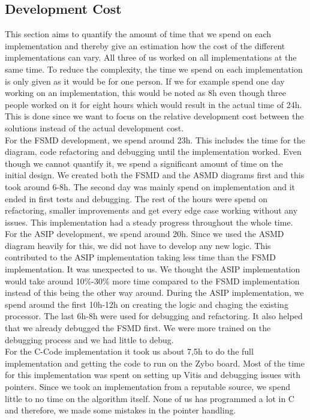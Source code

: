 \documentclass[conference]{IEEEtran}
\begin{document}
\subsection{Development Cost}
This section aims to quantify the amount of time that we spend on each implementation and thereby give an estimation how the cost of the different implementations can vary. All three of us worked on all implementations at the same time. To reduce the complexity, the time we spend on each implementation is only given as it would be for one person. If we for example spend one day working on an implementation, this would be noted as 8h even though three people worked on it for eight hours which would result in the actual time of 24h. This is done since we want to focus on the relative development cost between the solutions instead of the actual development cost.\\
For the FSMD development, we spend around 23h. This includes the time for the diagram, code refactoring and debugging until the implementation worked. Even though we cannot quantify it, we spend a significant amount of time on the initial design. We created both the FSMD and the ASMD diagrams first and this took around 6-8h. The second day was mainly spend on implementation and it ended in first tests and debugging. The rest of the hours were spend on refactoring, smaller improvements and get every edge case working without any issues. This implementation had a steady progress throughout the whole time.\\
For the ASIP development, we spend around 20h. Since we used the ASMD diagram heavily for this, we did not have to develop any new logic. This contributed to the ASIP implementation taking less time than the FSMD implementation. It was unexpected to us. We thought the ASIP implementation would take around 10\%-30\% more time compared to the FSMD implementation instead of this being the other way around. During the ASIP implementation, we spend around the first 10h-12h on creating the logic and chaging the existing processor. The last 6h-8h were used for debugging and refactoring. It also helped that we already debugged the FSMD first. We were more trained on the debugging process and we had little to debug. \\
For the C-Code implementation it took us about 7,5h to do the full implementation and getting the code to run on the Zybo board. Most of the time for this implementation was spent on setting up Vitis and debugging issues with pointers. Since we took an implementation from a reputable source, we spend little to no time on the algorithm itself. None of us has programmed a lot in C and therefore, we made some mistakes in the pointer handling.\\
\end{document}
